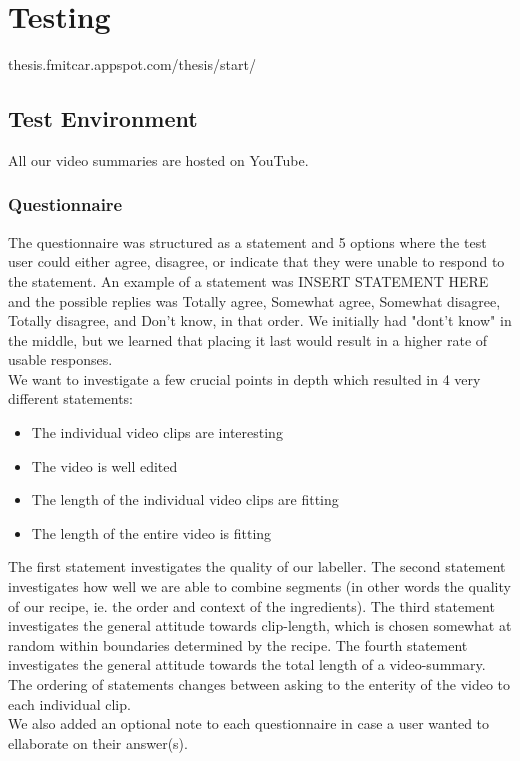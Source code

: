 %
\section{Testing}
%
thesis.fmitcar.appspot.com/thesis/start/
%
\subsection{Test Environment}
%

%
All our video summaries are hosted on YouTube.
%
\subsubsection{Questionnaire}
%
%
The questionnaire was structured as a statement and 5 options
%
%
where the test user could either agree, disagree, or indicate that they were unable to respond to the statement. An example of a statement was INSERT STATEMENT HERE and the possible replies was Totally agree, Somewhat agree, Somewhat disagree, Totally disagree, and Don't know, in that order. We initially had "dont't know" in the middle, but we learned that placing it last would result in a higher rate of usable responses.\\
%
%
%
%
We want to investigate a few crucial points in depth which resulted in 4 very different statements:
%
\begin{itemize}
\item The individual video clips are interesting
\item The video is well edited
\item The length of the individual video clips are fitting
\item The length of the entire video is fitting
\end{itemize}
%
The first statement investigates the quality of our labeller. The second statement investigates how well we are able to combine segments (in other words the quality of our recipe, ie. the order and context of the ingredients). The third statement investigates the general attitude towards clip-length, which is chosen somewhat at random within boundaries determined by the recipe. The fourth statement investigates the general attitude towards the total length of a video-summary. The ordering of statements changes between asking to the enterity of the video to each individual clip.\\
We also added an optional note to each questionnaire in case a user wanted to ellaborate on their answer(s).
%
